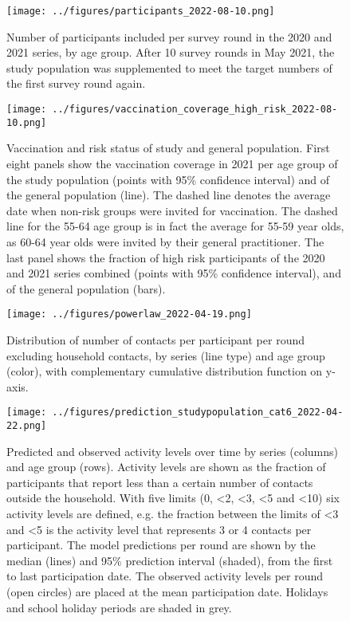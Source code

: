 \documentclass[fleqn,10pt]{wlscirep}
\begin{document}
\clearpage

\begin{figure}[ht]
\centering
\texttt{[image: ../figures/participants\_2022-08-10.png]}
\caption{Number of participants included per survey round in the 2020 and 2021 series, by age group. After 10 survey rounds in May 2021, the study population was supplemented to meet the target numbers of the first survey round again.}
\label{fig:part}
\end{figure}

\clearpage


\begin{figure}[ht]
\centering
\texttt{[image: ../figures/vaccination\_coverage\_high\_risk\_2022-08-10.png]}
\caption{Vaccination and risk status of study and general population. First eight panels show the vaccination coverage in 2021 per age group of the study population (points with 95\% confidence interval) and of the general population \cite{RIVM_2022} (line). The dashed line denotes the average date when non-risk groups were invited for vaccination. The dashed line for the 55-64 age group is in fact the average for 55-59 year olds, as 60-64 year olds were invited by their general practitioner. The last panel shows the fraction of high risk participants of the 2020 and 2021 series combined (points with 95\% confidence interval), and of the general population \cite{Nivel_2021} (bars).}
\label{fig:vacc_risk}
\end{figure}

\clearpage


\begin{figure}[ht]
\centering
\texttt{[image: ../figures/powerlaw\_2022-04-19.png]}
\caption{Distribution of number of contacts per participant per round excluding household contacts, by series (line type) and age group (color), with complementary cumulative distribution function on y-axis.}
\label{fig:powerlaw}
\end{figure}

\clearpage

\begin{figure}[ht]
\centering
\texttt{[image: ../figures/prediction\_studypopulation\_cat6\_2022-04-22.png]}
\caption{Predicted and observed activity levels over time by series (columns) and age group (rows). Activity levels are shown as the fraction of participants that report less than a certain number of contacts outside the household. With five limits (0, <2, <3, <5 and <10) six activity levels are defined, e.g. the fraction between the limits of <3 and <5 is the activity level that represents 3 or 4 contacts per participant. The model predictions per round are shown by the median (lines) and 95\% prediction interval (shaded), from the first to last participation date. The observed activity levels per round (open circles) are placed at the mean participation date. Holidays and school holiday periods are shaded in grey.}
\label{fig:studypop}
\end{figure}
\end{document}
